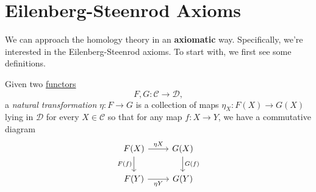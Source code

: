 \section{Eilenberg-Steenrod Axioms}
We can approach the homology theory in an \textbf{axiomatic} way. Specifically, we're interested in the Eilenberg-Steenrod axioms.
To start with, we first see some definitions.

\begin{definition}\label{def:natural-transformation}
	Given two \hyperref[def:functor]{functors}
	\[
		F, G \colon \mathscr{C} \to \mathscr{D},
	\]
	a \emph{natural transformation} \(\eta \colon F \to G\) is a collection of maps \(\eta_X \colon F(X) \to G(X)\) lying
	in \(\mathscr{D}\) for every \(X \in \mathscr{C}\) so that for any map \(f \colon X \to Y\), we have a commutative diagram
	\[
		\begin{tikzcd}
			{F(X)} & {G(X)} \\
			{F(Y)} & {G(Y)}
			\arrow["{\eta X}", from=1-1, to=1-2]
			\arrow["{G(f)}", from=1-2, to=2-2]
			\arrow["{\eta Y}"', from=2-1, to=2-2]
			\arrow["{F(f)}"', from=1-1, to=2-1]
		\end{tikzcd}
	\]
\end{definition}

